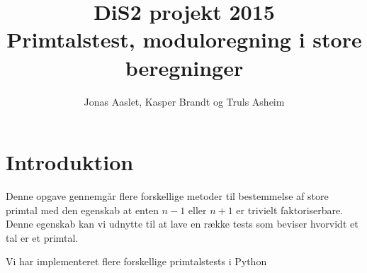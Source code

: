 \documentclass[a4paper]{article}
\title{DiS2 projekt 2015\\Primtalstest, moduloregning i store beregninger}
\author{Jonas Aaslet, Kasper Brandt og Truls Asheim}
\begin{document}
\begin{titlepage}
\maketitle
\end{titlepage}


\section{Introduktion}

Denne opgave gennemgår flere forskellige metoder til bestemmelse af
store primtal med den egenskab at enten $n-1$ eller $n+1$ er trivielt
faktoriserbare. Denne egenskab kan vi udnytte til at lave en række
tests som beviser hvorvidt et tal er et primtal. 

Vi har implementeret flere forskellige primtalstests i Python 






\end{document}
